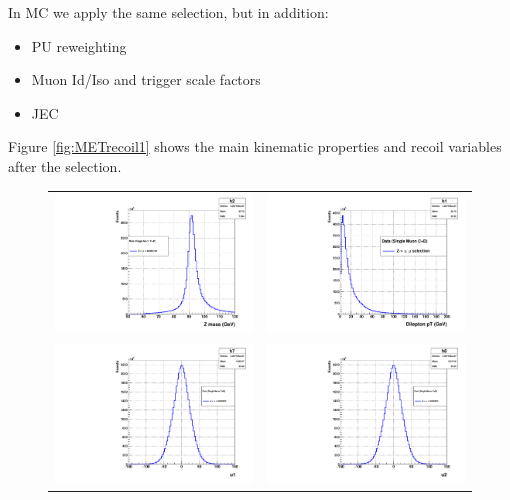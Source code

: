In MC we apply the same selection, but in addition:
\begin{itemize}
\item
PU reweighting
\item
Muon Id/Iso and trigger scale factors
\item
JEC
\end{itemize}
Figure \ref{fig:METrecoil1} shows the main kinematic properties and recoil variables after the selection.
\newpage
\begin{figure}[!ht]
\begin{tabular}{cc}
  \includegraphics[width=180pt]{figuresARC/recoil/dileptonMass.pdf} &
  \includegraphics[width=180pt]{figuresARC/recoil/dileptonpt.pdf} \\
  \includegraphics[width=180pt]{figuresARC/recoil/u1.pdf} &
  \includegraphics[width=180pt]{figuresARC/recoil/u2.pdf} \\

\end{tabular}
\end{figure}

